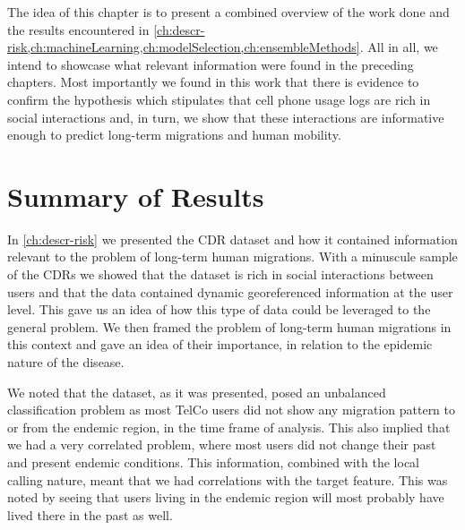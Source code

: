 

The idea of this chapter is to present a combined overview of the work done and the results encountered in
\cref{ch:descr-risk,ch:machineLearning,ch:modelSelection,ch:ensembleMethods}.
All in all, we intend to showcase what relevant information were found in the preceding chapters.
Most importantly we found in this work that there is evidence to confirm the hypothesis which stipulates that cell phone usage logs are rich in social interactions and, in turn, we show that these interactions are informative enough to predict long-term migrations and human mobility.

\chapter{Summary of Results}\label{ch:results}


In \cref{ch:descr-risk} we presented the CDR dataset and how it contained information relevant to the problem of long-term human migrations.
With a minuscule sample of the CDRs we showed that the dataset is rich in social interactions between users and that the data contained dynamic georeferenced information at the user level.
This gave us an idea of how this type of data could be leveraged to the general problem.
We then framed the problem of long-term human migrations in this context and gave an idea of their importance, in relation to the epidemic nature of the disease.

We noted that the dataset, as it was presented, posed an unbalanced classification problem as most TelCo users did not show any migration pattern to or from the endemic region, in the time frame of analysis.
This also implied that we had a very correlated problem, where most users did not change their past and present endemic conditions.
This information, combined with the local calling nature, meant that we had correlations with the target feature.
This was noted by seeing that users living in the endemic region will most probably have lived there in the past as well.


